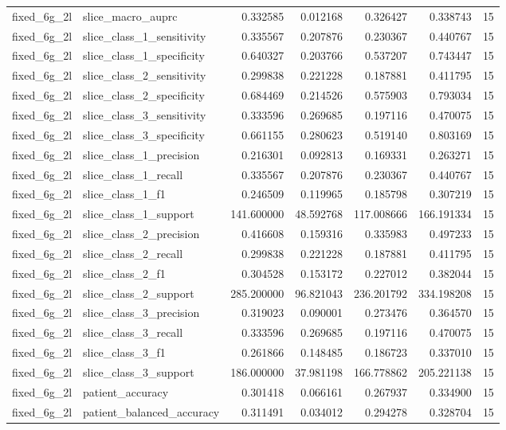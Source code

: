 \begin{tabular}{llrrrrr}
fixed_6g_2l & slice_macro_auprc & 0.332585 & 0.012168 & 0.326427 & 0.338743 & 15 \\
fixed_6g_2l & slice_class_1_sensitivity & 0.335567 & 0.207876 & 0.230367 & 0.440767 & 15 \\
fixed_6g_2l & slice_class_1_specificity & 0.640327 & 0.203766 & 0.537207 & 0.743447 & 15 \\
fixed_6g_2l & slice_class_2_sensitivity & 0.299838 & 0.221228 & 0.187881 & 0.411795 & 15 \\
fixed_6g_2l & slice_class_2_specificity & 0.684469 & 0.214526 & 0.575903 & 0.793034 & 15 \\
fixed_6g_2l & slice_class_3_sensitivity & 0.333596 & 0.269685 & 0.197116 & 0.470075 & 15 \\
fixed_6g_2l & slice_class_3_specificity & 0.661155 & 0.280623 & 0.519140 & 0.803169 & 15 \\
fixed_6g_2l & slice_class_1_precision & 0.216301 & 0.092813 & 0.169331 & 0.263271 & 15 \\
fixed_6g_2l & slice_class_1_recall & 0.335567 & 0.207876 & 0.230367 & 0.440767 & 15 \\
fixed_6g_2l & slice_class_1_f1 & 0.246509 & 0.119965 & 0.185798 & 0.307219 & 15 \\
fixed_6g_2l & slice_class_1_support & 141.600000 & 48.592768 & 117.008666 & 166.191334 & 15 \\
fixed_6g_2l & slice_class_2_precision & 0.416608 & 0.159316 & 0.335983 & 0.497233 & 15 \\
fixed_6g_2l & slice_class_2_recall & 0.299838 & 0.221228 & 0.187881 & 0.411795 & 15 \\
fixed_6g_2l & slice_class_2_f1 & 0.304528 & 0.153172 & 0.227012 & 0.382044 & 15 \\
fixed_6g_2l & slice_class_2_support & 285.200000 & 96.821043 & 236.201792 & 334.198208 & 15 \\
fixed_6g_2l & slice_class_3_precision & 0.319023 & 0.090001 & 0.273476 & 0.364570 & 15 \\
fixed_6g_2l & slice_class_3_recall & 0.333596 & 0.269685 & 0.197116 & 0.470075 & 15 \\
fixed_6g_2l & slice_class_3_f1 & 0.261866 & 0.148485 & 0.186723 & 0.337010 & 15 \\
fixed_6g_2l & slice_class_3_support & 186.000000 & 37.981198 & 166.778862 & 205.221138 & 15 \\
fixed_6g_2l & patient_accuracy & 0.301418 & 0.066161 & 0.267937 & 0.334900 & 15 \\
fixed_6g_2l & patient_balanced_accuracy & 0.311491 & 0.034012 & 0.294278 & 0.328704 & 15 \\

\end{tabular}
